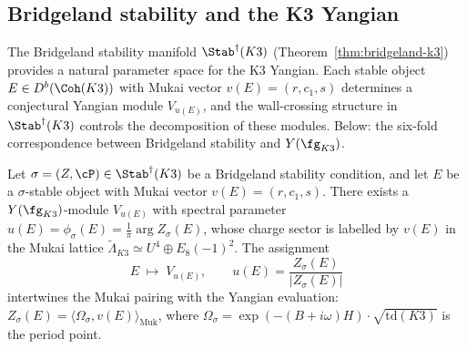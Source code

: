 
\subsection{Bridgeland stability and the K3 Yangian}
\label{subsec:bridgeland-k3-yangian}

The Bridgeland stability manifold $\Stab^\dagger(K3)$ (Theorem~\ref{thm:bridgeland-k3}) provides a natural parameter space for the K3 Yangian. Each stable object $E \in D^b(\Coh(K3))$ with Mukai vector $v(E) = (r, c_1, s)$ determines a conjectural Yangian module $V_{u(E)}$, and the wall-crossing structure in $\Stab^\dagger(K3)$ controls the decomposition of these modules. Below: the six-fold correspondence between Bridgeland stability and $Y(\fg_{K3})$.

\begin{conjecture}
\label{conj:stable-yangian-module}
\ClaimStatusConjectured
Let $\sigma = (Z, \cP) \in \Stab^\dagger(K3)$ be a Bridgeland stability condition, and let $E$ be a $\sigma$-stable object with Mukai vector $v(E) = (r, c_1, s)$. There exists a $Y(\fg_{K3})$-module $V_{u(E)}$ with spectral parameter $u(E) = \phi_\sigma(E) = \frac{1}{\pi}\arg Z_\sigma(E)$, whose charge sector is labelled by $v(E)$ in the Mukai lattice $\widetilde{\Lambda}_{K3} \simeq U^4 \oplus E_8(-1)^2$. The assignment
\[
 E \;\longmapsto\; V_{u(E)}, \qquad u(E) = \frac{Z_\sigma(E)}{|Z_\sigma(E)|}
\]
intertwines the Mukai pairing with the Yangian evaluation:
$Z_\sigma(E) = \langle \Omega_\sigma, v(E) \rangle_{\mathrm{Muk}}$, where $\Omega_\sigma = \exp(-(B + i\omega)H) \cdot \sqrt{\mathrm{td}(K3)}$ is the period point.
\end{conjecture}

